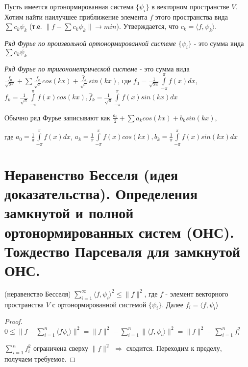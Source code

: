 \documentclass{article}
\begin{document}
	Пусть имеется ортонормированная система $\{{\psi_i}\}$ в векторном пространстве $V$. Хотим найти наилучшее приближение элемента $f$ этого пространства вида $\sum c_k \psi_k$ (т.е. $\|f-\sum c_k \psi_k\| \rightarrow min$). Утверждается, что $c_k=\langle f, \psi_k\rangle$.
	
	 \begin{definition}
	 	\textit{Ряд Фурье по произвольной ортонормированной системе $\{{\psi_i}\}$} - это сумма вида $\sum c_k \psi_k$
	 \end{definition}
 
	 \begin{definition}
	 	\textit{Ряд Фурье по тригонометрической системе} - это сумма вида $\frac{f_0}{\sqrt{2\pi}} +\sum \frac{f_k}{\sqrt{\pi}}cos(kx) + \frac{\hat f_k}{\sqrt{\pi}}sin(kx)$, где $f_0=\frac{1}{\sqrt{2\pi}}\int\limits_{-\pi}^{\pi} f(x) dx$, $f_k=\frac{1}{\sqrt{\pi}}\int\limits_{-\pi}^{\pi} f(x)cos(kx), \hat f_k=\frac{1}{\sqrt{\pi}}\int\limits_{-\pi}^{\pi} f(x)sin(kx) dx$
	 \end{definition}
 
 	Обычно ряд Фурье записывают как $\frac{a_0}{2} + \sum a_k cos(kx) + b_k sin(kx)$,
 	
 	где $a_0=\frac{1}{\pi}\int\limits_{-\pi}^{\pi} f(x) dx$, $a_k=\frac{1}{\pi}\int\limits_{-\pi}^{\pi} f(x)cos(kx), b_k=\frac{1}{\pi}\int\limits_{-\pi}^{\pi} f(x)sin(kx) dx$
	
	\section{Неравенство Бесселя (идея доказательства). Определения замкнутой и полной ортонормированных систем (ОНС). Тождество Парсеваля для замкнутой ОНС.}
	
	\begin{theorem} 
		(неравенство Бесселя) $\sum_{i=1}^{\infty} \langle f, \psi_i \rangle^2 \le \| f \|^2$, где $f$ - элемент векторного пространства $V$ с ортонормированной системой $\{{\psi_i}\}$. Далее $f_i=\langle f, \psi_i \rangle$
	\end{theorem}
	\begin{proof}
		$0 \le \| f- \sum_{i=1}^{n} \langle f \psi_i \rangle \|^2=\|f\|^2-\sum_{i=1}^{n} \|\langle f, \psi_i \rangle \|^2=\|f\|^2-\sum_{i=1}^{n} f_i ^2$ 
		
		$\sum_{i=1}^{n} f_i^2$ ограничена сверху $\|f\|^2$ $\Rightarrow$  сходится. Переходим к пределу, получаем требуемое. 
	\end{proof}
\end{document}
